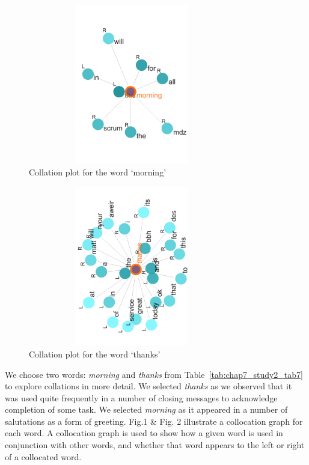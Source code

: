 \begin{figure}[]
\begin{center}
\includegraphics[height=7cm, width=9cm]{graphs/hellogoodbye/morning.pdf} 
\caption{Collation plot for the word `morning'}
\end{center}
\label{fig:chapt7_study2_fig1}
\end{figure}

\begin{figure}[]
\begin{center}
\includegraphics[height=7cm, width=9cm, angle =270]{graphs/hellogoodbye/thanks.pdf} 
\caption{Collation plot for the word `thanks'}
\end{center}
\label{fig:chapt7_study2_fig2}
\end{figure}

We choose two words: \textit{morning} and \textit{thanks} from Table~\ref{tab:chap7_study2_tab7} to explore collations in more detail. We selected \textit{thanks} as we observed that it was used quite frequently in a number of closing messages to acknowledge completion of some task. We selected \textit{morning} as it appeared in a number of salutations as a form of greeting. Fig.1 \& Fig. 2 illustrate a collocation graph for each word. A collocation graph is used to show how a given word is used in conjunction with other words, and whether that word appears to the left or right of a collocated word.

